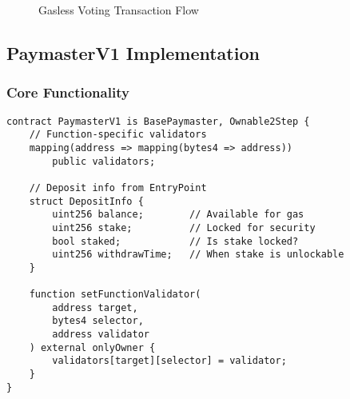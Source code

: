\documentclass[11pt,a4paper]{article}
\begin{document}
\begin{figure}[h]
\centering
{}
\caption{Gasless Voting Transaction Flow}
\end{figure}

\subsection{PaymasterV1 Implementation}

\subsubsection{Core Functionality}

\begin{lstlisting}[caption=Paymaster Core Structure]
contract PaymasterV1 is BasePaymaster, Ownable2Step {
    // Function-specific validators
    mapping(address => mapping(bytes4 => address))
        public validators;

    // Deposit info from EntryPoint
    struct DepositInfo {
        uint256 balance;        // Available for gas
        uint256 stake;          // Locked for security
        bool staked;            // Is stake locked?
        uint256 withdrawTime;   // When stake is unlockable
    }

    function setFunctionValidator(
        address target,
        bytes4 selector,
        address validator
    ) external onlyOwner {
        validators[target][selector] = validator;
    }
}
\end{lstlisting}
\end{document}
